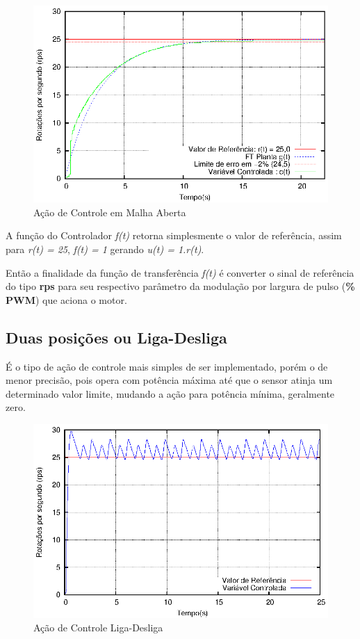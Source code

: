 \begin{figure}[!htb]
\center\includegraphics[scale=1]{./imagens/acaoMalhaAberta.eps}
\caption{Ação de Controle em Malha Aberta}
\label{fig:acaoMalhaAberta}
\end{figure}

A função do Controlador \emph{f(t)} retorna simplesmente o valor de referência, assim para \emph{r(t) = 25}, \emph{f(t) = 1} gerando \emph{u(t) = 1.r(t)}.

Então a finalidade da função de transferência \emph{f(t)} é converter o sinal de referência do tipo \textbf{rps} para seu respectivo parâmetro da modulação por largura de pulso (\textbf{\% PWM}) que aciona o motor.




\subsection{ Duas posições ou Liga-Desliga }
É o tipo de ação de controle mais simples de ser implementado, porém o de menor precisão, pois opera com potência máxima até que o sensor atinja um determinado valor limite, mudando a ação para potência mínima, geralmente zero.

\begin{figure}[!htb]
\center\includegraphics[scale=1]{./imagens/acaoControle-ligaDesliga.eps}
\caption{Ação de Controle Liga-Desliga}
\label{fig:acaoControleLigaDesliga}
\end{figure}

